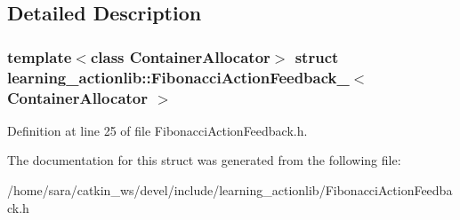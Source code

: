 \subsection{Detailed Description}
\subsubsection*{template$<$class Container\+Allocator$>$\newline
struct learning\+\_\+actionlib\+::\+Fibonacci\+Action\+Feedback\+\_\+$<$ Container\+Allocator $>$}



Definition at line 25 of file Fibonacci\+Action\+Feedback.\+h.



The documentation for this struct was generated from the following file\+:\begin{DoxyCompactItemize}
\item 
/home/sara/catkin\+\_\+ws/devel/include/learning\+\_\+actionlib/Fibonacci\+Action\+Feedback.\+h\end{DoxyCompactItemize}
